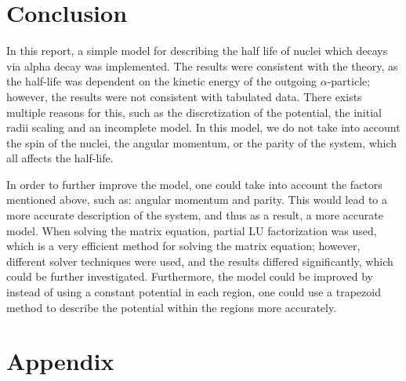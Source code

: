 \documentclass[a4paper]{article}
\newcommand{\newparagraph}{\vspace{.5cm}\noindent}
\begin{document}
\section{Conclusion}
In this report, a simple model for describing the half life of nuclei which decays via alpha decay was implemented.
The results were consistent with the theory, as the half-life was dependent on the kinetic energy of the outgoing $\alpha$-particle;
however, the results were not consistent with tabulated data.
There exists multiple reasons for this, such as the discretization of the potential, the initial radii scaling and an incomplete model.
In this model, we do not take into account the spin of the nuclei, the angular momentum, or the parity of the system, which all affects the half-life.

\newparagraph
In order to further improve the model, one could take into account the factors mentioned above, such as: angular momentum and parity.
This would lead to a more accurate description of the system, and thus as a result, a more accurate model.
When solving the matrix equation, partial LU factorization was used\cite{eigenweb}, which is a very efficient method for solving the matrix equation;
however, different solver techniques were used, and the results differed significantly, which could be further investigated.
Furthermore, the model could be improved by instead of using a constant potential in each region, one could use a trapezoid method to describe the potential within the regions more accurately.

\newpage
\printbibliography


\section*{Appendix}\label{sec: Appendix}

\end{document}
